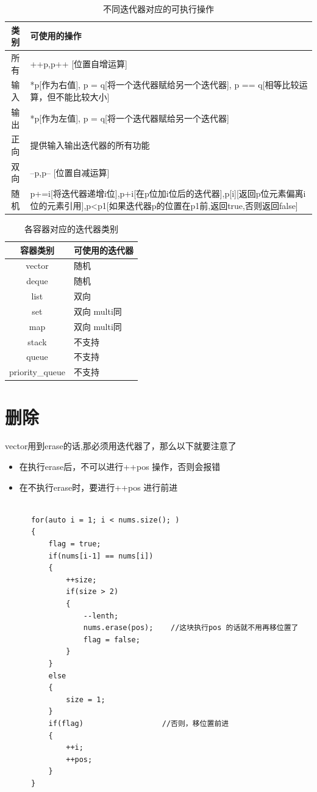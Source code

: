 \documentclass[UTF8,a4paper,12pt]{ctexbook}
\begin{document}
			\begin{table}[h]
				\centering
				\caption{不同迭代器对应的可执行操作}
				\begin{tabular}{c|m{15cm}}
					\hline 
					类别 & 可使用的操作\\
					\hline
					所有  & ++p,p++ [位置自增运算]\\
					\hline
					输入  & *p[作为右值], p = q[将一个迭代器赋给另一个迭代器], p == q[相等比较运算，但不能比较大小]\\
					\hline
					输出  & *p[作为左值], p = q[将一个迭代器赋给另一个迭代器]\\
					\hline
					正向  & 提供输入输出迭代器的所有功能\\
					\hline
					双向  & --p,p-- [位置自减运算]\\
					\hline
					随机  & p+=i[将迭代器递增i位],p+i[在p位加i位后的迭代器],p[i][返回p位元素偏离i位的元素引用],p<p1[如果迭代器p的位置在p1前,返回true,否则返回false]\\
					\hline
				\end{tabular}
			\end{table}
			
			\begin{table}[h]
				\centering
				\caption{各容器对应的迭代器类别}
				\begin{tabular}{c|m{15cm}}
					\hline 
					容器类别 & 可使用的迭代器\\
					\hline
					vector	& 随机\\
					deque   & 随机\\
					\hline
					list    & 双向\\
					set     & 双向 multi同\\
					map     & 双向 multi同\\
					\hline
					stack   & 不支持\\
					queue   & 不支持\\
					priority\_queue    & 不支持\\
					\hline
				\end{tabular}
			\end{table}
				
	\section{删除}
		vector用到erase的话,那必须用迭代器了，那么以下就要注意了
		\begin{itemize}
			\item 在执行erase后，不可以进行++pos 操作，否则会报错
			\item 在不执行erase时，要进行++pos 进行前进
		\end{itemize}
\begin{lstlisting}

	  for(auto i = 1; i < nums.size(); )
	  {
		  flag = true;
		  if(nums[i-1] == nums[i])
		  {
			  ++size;
			  if(size > 2)
			  {
				  --lenth;
				  nums.erase(pos);    //这块执行pos 的话就不用再移位置了
				  flag = false;
			  }
		  }
		  else
		  {
			  size = 1;
		  }
		  if(flag)					//否则，移位置前进
		  {
			  ++i;
			  ++pos;
		  }
	  }
\end{lstlisting}
		
\end{document}

